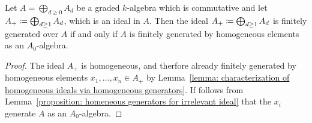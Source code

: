 \begin{corollary}
  \label{corollary: finite homogeneous generatiors for irrelevant ideal}
  Let $A = \bigoplus_{d \geq 0} A_d$ be a graded $k$-algebra which is commutative and let $A_+ \coloneqq \bigoplus_{d \geq 1} A_d$, which is an ideal in $A$.
  Then the ideal $A_+ \coloneqq \bigoplus_{d \geq 1} A_d$ is finitely generated over $A$ if and only if $A$ is finitely generated by homogeneous elements as an $A_0$-algebra.
\end{corollary}


\begin{proof}
  The ideal $A_+$ is homogeneous, and therfore already finitely generated by homogeneous elements $x_1, \dotsc, x_n \in A_+$ by Lemma~\ref{lemma: characterization of homogeneous ideals via homogeneous generators}.
  If follows from Lemma~\ref{proposition: homeneous generators for irrelevant ideal} that the $x_i$ generate $A$ as an $A_0$-algebra.
\end{proof}



